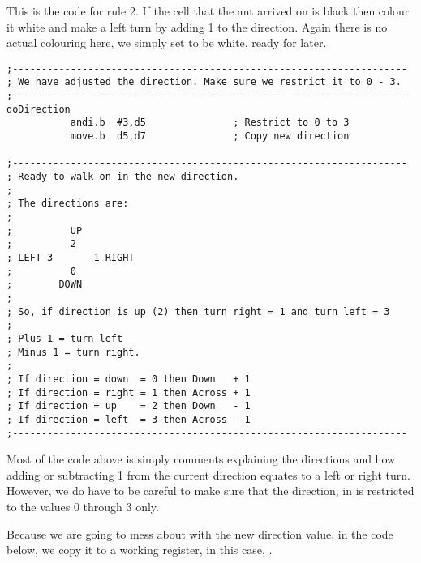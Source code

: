 This is the code for rule 2. If the cell that the ant arrived on is black then colour it white and make a left turn by adding 1 to the direction. Again there is no actual colouring here, we simply set  to be white, ready for later.

\begin{lstlisting}[firstnumber=last,caption={Langtons Ant - New Direction}]
;--------------------------------------------------------------------
; We have adjusted the direction. Make sure we restrict it to 0 - 3.
;--------------------------------------------------------------------
doDirection
           andi.b  #3,d5               ; Restrict to 0 to 3
           move.b  d5,d7               ; Copy new direction

;--------------------------------------------------------------------
; Ready to walk on in the new direction. 
;
; The directions are:
;
;          UP
;          2
; LEFT 3       1 RIGHT
;          0
;        DOWN
;
; So, if direction is up (2) then turn right = 1 and turn left = 3
;
; Plus 1 = turn left
; Minus 1 = turn right.
;
; If direction = down  = 0 then Down   + 1
; If direction = right = 1 then Across + 1
; If direction = up    = 2 then Down   - 1
; If direction = left  = 3 then Across - 1
;--------------------------------------------------------------------

\end{lstlisting}

Most of the code above is simply comments explaining the directions and how adding or subtracting 1 from the current direction equates to a left or right turn. However, we do have to be careful to make sure that the direction, in  is restricted to the values 0 through 3 only.

Because we are going to mess about with the new direction value, in the code below, we copy it to a working register, in this case, .

